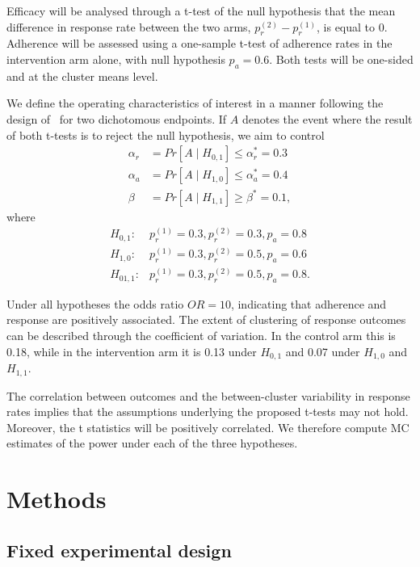 \documentclass{article} %
\begin{document}
Efficacy will be analysed through a t-test of the null hypothesis that the mean difference in response rate between the two arms, $p_{r}^{(2)} - p_{r}^{(1)}$, is equal to 0. Adherence will be assessed using a one-sample t-test of adherence rates in the intervention arm alone, with null hypothesis $p_{a} = 0.6$. Both tests will be one-sided and at the cluster means level. 

We define the operating characteristics of interest in a manner following the design of~\cite{Bryant1995} for two dichotomous endpoints. If $A$ denotes the event where the result of both t-tests is to reject the null hypothesis, we aim to control 
\begin{align}
\alpha_{r} &= Pr[A \mid H_{0,1}] \leq \alpha_{r}^{*} = 0.3 \\
\alpha_{a} &= Pr[A \mid H_{1,0}] \leq \alpha_{a}^{*} = 0.4 \\
\beta &= Pr[A \mid H_{1,1}] \geq \beta^{*} = 0.1,
\end{align}
where
\begin{align}
H_{0,1}:& p_{r}^{(1)} = 0.3, p_{r}^{(2)} = 0.3, p_{a} = 0.8 \\
H_{1,0}:& p_{r}^{(1)} = 0.3, p_{r}^{(2)} = 0.5, p_{a} = 0.6 \\
H_{01,1}:& p_{r}^{(1)} = 0.3, p_{r}^{(2)} = 0.5, p_{a} = 0.8.
\end{align}

Under all hypotheses the odds ratio $OR = 10$, indicating that adherence and response are positively associated. The extent of clustering of response outcomes can be described through the coefficient of variation. In the control arm this is 0.18, while in the intervention arm it is 0.13 under $H_{0,1}$ and 0.07 under $H_{1,0}$ and $H_{1,1}$.

The correlation between outcomes and the between-cluster variability in response rates implies that the assumptions underlying the proposed t-tests may not hold. Moreover, the t statistics will be positively correlated. We therefore compute MC estimates of the power under each of the three hypotheses. 

\section{Methods}\label{sec:methods}

\subsection{Fixed experimental design}
\end{document}
